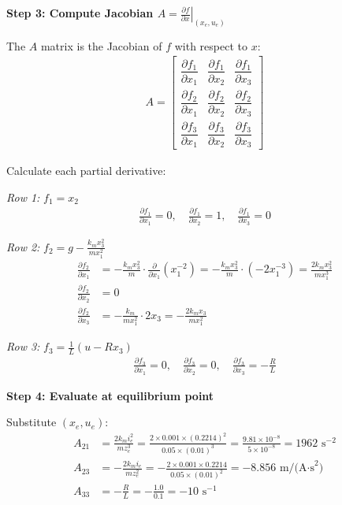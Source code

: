 \documentclass[11pt,a4paper]{article}
\begin{document}
\textbf{Step 3: Compute Jacobian $A = \left.\frac{\partial f}{\partial x}\right|_{(x_e,u_e)}$}

The $A$ matrix is the Jacobian of $f$ with respect to $x$:
\begin{align}
A = \begin{bmatrix}
\dfrac{\partial f_1}{\partial x_1} & \dfrac{\partial f_1}{\partial x_2} & \dfrac{\partial f_1}{\partial x_3}\\[0.5em]
\dfrac{\partial f_2}{\partial x_1} & \dfrac{\partial f_2}{\partial x_2} & \dfrac{\partial f_2}{\partial x_3}\\[0.5em]
\dfrac{\partial f_3}{\partial x_1} & \dfrac{\partial f_3}{\partial x_2} & \dfrac{\partial f_3}{\partial x_3}
\end{bmatrix}
\end{align}

Calculate each partial derivative:

\emph{Row 1:} $f_1 = x_2$
\begin{align}
\frac{\partial f_1}{\partial x_1} = 0, \quad \frac{\partial f_1}{\partial x_2} = 1, \quad \frac{\partial f_1}{\partial x_3} = 0
\end{align}

\emph{Row 2:} $f_2 = g - \frac{k_m x_3^2}{m x_1^2}$
\begin{align}
\frac{\partial f_2}{\partial x_1} &= -\frac{k_m x_3^2}{m} \cdot \frac{\partial}{\partial x_1}\left(x_1^{-2}\right) = -\frac{k_m x_3^2}{m} \cdot (-2x_1^{-3}) = \frac{2k_m x_3^2}{m x_1^3}\\
\frac{\partial f_2}{\partial x_2} &= 0\\
\frac{\partial f_2}{\partial x_3} &= -\frac{k_m}{m x_1^2} \cdot 2x_3 = -\frac{2k_m x_3}{m x_1^2}
\end{align}

\emph{Row 3:} $f_3 = \frac{1}{L}(u - Rx_3)$
\begin{align}
\frac{\partial f_3}{\partial x_1} = 0, \quad \frac{\partial f_3}{\partial x_2} = 0, \quad \frac{\partial f_3}{\partial x_3} = -\frac{R}{L}
\end{align}

\textbf{Step 4: Evaluate at equilibrium point}

Substitute $(x_e, u_e)$:
\begin{align}
A_{21} &= \frac{2k_m i_e^2}{m z_e^3} = \frac{2 \times 0.001 \times (0.2214)^2}{0.05 \times (0.01)^3} = \frac{9.81 \times 10^{-8}}{5 \times 10^{-8}} = 1962 \text{ s}^{-2}\\
A_{23} &= -\frac{2k_m i_e}{m z_e^2} = -\frac{2 \times 0.001 \times 0.2214}{0.05 \times (0.01)^2} = -8.856 \text{ m/(A·s}^2\text{)}\\
A_{33} &= -\frac{R}{L} = -\frac{1.0}{0.1} = -10 \text{ s}^{-1}
\end{align}
\end{document}

